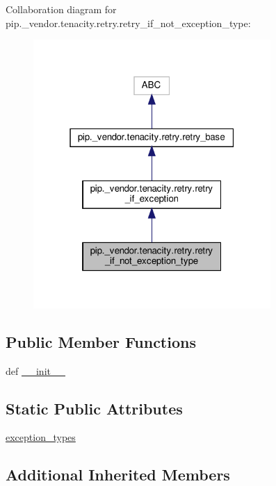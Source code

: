 Collaboration diagram for pip.\+\_\+vendor.\+tenacity.\+retry.\+retry\+\_\+if\+\_\+not\+\_\+exception\+\_\+type\+:
\nopagebreak
\begin{figure}[H]
\begin{center}
\leavevmode
\includegraphics[width=256pt]{classpip_1_1__vendor_1_1tenacity_1_1retry_1_1retry__if__not__exception__type__coll__graph}
\end{center}
\end{figure}
\subsection*{Public Member Functions}
\begin{DoxyCompactItemize}
\item 
def \hyperlink{classpip_1_1__vendor_1_1tenacity_1_1retry_1_1retry__if__not__exception__type_adb34ac0196f348bdddcd0fe3300b42ff}{\+\_\+\+\_\+init\+\_\+\+\_\+}
\end{DoxyCompactItemize}
\subsection*{Static Public Attributes}
\begin{DoxyCompactItemize}
\item 
\hyperlink{classpip_1_1__vendor_1_1tenacity_1_1retry_1_1retry__if__not__exception__type_a4b88ecbd0655385cec74546f8d2bdde3}{exception\+\_\+types}
\end{DoxyCompactItemize}
\subsection*{Additional Inherited Members}


